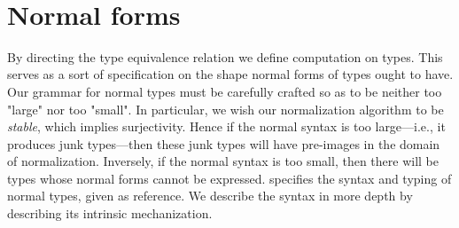 \documentclass[authoryear, acmsmall, screen, review, nonacm]{acmart} %
\begin{document}
\begin{code}
\AgdaSymbol{:}%
\>[2660I]\AgdaSpace{}%
\AgdaSymbol{\{}\AgdaSymbol{\}}\AgdaSpace{}%
\AgdaSymbol{\{}\AgdaSpace{}%
\AgdaSymbol{:}\AgdaSpace{}%
\AgdaSpace{}%
\AgdaSymbol{(}\AgdaSpace{}%
\AgdaOperator{\AgdaInductiveConstructor{,,}}\AgdaSpace{}%
\AgdaSymbol{)}\AgdaSpace{}%
\AgdaSymbol{\}}\AgdaSpace{}%
\AgdaSymbol{\{}\AgdaSpace{}%
\AgdaSymbol{:}\AgdaSpace{}%
\AgdaSpace{}%
\AgdaSymbol{(}\AgdaSpace{}%
\AgdaSymbol{)\}}\AgdaSpace{}%
\<%
\\
\>[.][@{}l@{}]\<[2660I]%
\>[8]\AgdaSpace{}%
\AgdaSymbol{\{}\AgdaSpace{}%
\AgdaSymbol{=}\AgdaSpace{}%
\AgdaSymbol{\}}\AgdaSpace{}%
\AgdaSpace{}%
\AgdaSymbol{(}\AgdaSpace{}%
\AgdaSpace{}%
\AgdaSpace{}%
\AgdaSymbol{)}\AgdaSpace{}%
\AgdaSpace{}%
\AgdaSpace{}%
\AgdaSymbol{(}\AgdaSpace{}%
\AgdaSymbol{\{}\AgdaSpace{}%
\AgdaSymbol{=}\AgdaSpace{}%
\AgdaSymbol{\}}\AgdaSpace{}%
\AgdaSpace{}%
\AgdaSymbol{(}\AgdaSpace{}%
\AgdaSpace{}%
\AgdaSpace{}%
\AgdaSymbol{))}\<%
\end{code}
\begin{code}[hide]%
\>[0]\AgdaSpace{}%
\AgdaSymbol{=}\AgdaSpace{}%
\AgdaSpace{}%
\AgdaSymbol{\AgdaUnderscore{}}\<%
\end{code}


\section{Normal forms}

By directing the type equivalence relation we define computation on types. This serves as a sort of specification on the shape normal forms of types ought to have. Our grammar for normal types must be carefully crafted so as to be neither too "large" nor too "small". In particular, we wish our normalization algorithm to be \emph{stable}, which implies surjectivity. Hence if the normal syntax is too large---i.e., it produces junk types---then these junk types will have pre-images in the domain of normalization. Inversely, if the normal syntax is too small, then there will be types whose normal forms cannot be expressed.  specifies the syntax and typing of normal types, given as reference. We describe the syntax in more depth by describing its intrinsic mechanization.
\end{document}

